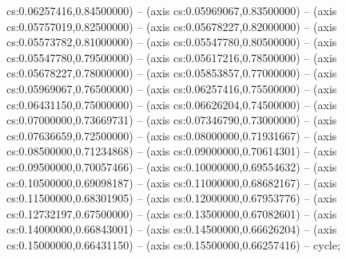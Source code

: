 cs:0.06257416,0.84500000) -- (axis cs:0.05969067,0.83500000) -- (axis cs:0.05757019,0.82500000) -- (axis cs:0.05678227,0.82000000) -- (axis cs:0.05573782,0.81000000) -- (axis cs:0.05547780,0.80500000) -- (axis cs:0.05547780,0.79500000) -- (axis cs:0.05617216,0.78500000) -- (axis cs:0.05678227,0.78000000) -- (axis cs:0.05853857,0.77000000) -- (axis cs:0.05969067,0.76500000) -- (axis cs:0.06257416,0.75500000) -- (axis cs:0.06431150,0.75000000) -- (axis cs:0.06626204,0.74500000) -- (axis cs:0.07000000,0.73669731) -- (axis cs:0.07346790,0.73000000) -- (axis cs:0.07636659,0.72500000) -- (axis cs:0.08000000,0.71931667) -- (axis cs:0.08500000,0.71234868) -- (axis cs:0.09000000,0.70614301) -- (axis cs:0.09500000,0.70057466) -- (axis cs:0.10000000,0.69554632) -- (axis cs:0.10500000,0.69098187) -- (axis cs:0.11000000,0.68682167) -- (axis cs:0.11500000,0.68301905) -- (axis cs:0.12000000,0.67953776) -- (axis cs:0.12732197,0.67500000) -- (axis cs:0.13500000,0.67082601) -- (axis cs:0.14000000,0.66843001) -- (axis cs:0.14500000,0.66626204) -- (axis cs:0.15000000,0.66431150) -- (axis cs:0.15500000,0.66257416) -- cycle;
